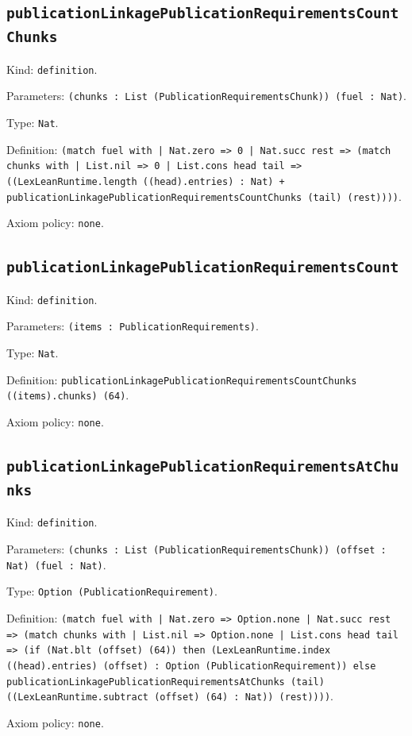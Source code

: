 \documentclass[11pt]{article}
\begin{document}
\subsection*{\texttt{publicationLinkagePublicationRequirementsCountChunks}}
\noindent Kind: \texttt{definition}.\par
\noindent Parameters: \texttt{(chunks : List (PublicationRequirementsChunk)) (fuel : Nat)}.\par
\noindent Type: \texttt{Nat}.\par
\noindent Definition: \texttt{(match fuel with | Nat.zero => 0 | Nat.succ rest => (match chunks with | List.nil => 0 | List.cons head tail => ((LexLeanRuntime.length ((head).entries) : Nat) + publicationLinkagePublicationRequirementsCountChunks (tail) (rest))))}.\par
\noindent Axiom policy: \texttt{none}.\par
\subsection*{\texttt{publicationLinkagePublicationRequirementsCount}}
\noindent Kind: \texttt{definition}.\par
\noindent Parameters: \texttt{(items : PublicationRequirements)}.\par
\noindent Type: \texttt{Nat}.\par
\noindent Definition: \texttt{publicationLinkagePublicationRequirementsCountChunks ((items).chunks) (64)}.\par
\noindent Axiom policy: \texttt{none}.\par
\subsection*{\texttt{publicationLinkagePublicationRequirementsAtChunks}}
\noindent Kind: \texttt{definition}.\par
\noindent Parameters: \texttt{(chunks : List (PublicationRequirementsChunk)) (offset : Nat) (fuel : Nat)}.\par
\noindent Type: \texttt{Option (PublicationRequirement)}.\par
\noindent Definition: \texttt{(match fuel with | Nat.zero => Option.none | Nat.succ rest => (match chunks with | List.nil => Option.none | List.cons head tail => (if (Nat.blt (offset) (64)) then (LexLeanRuntime.index ((head).entries) (offset) : Option (PublicationRequirement)) else publicationLinkagePublicationRequirementsAtChunks (tail) ((LexLeanRuntime.subtract (offset) (64) : Nat)) (rest))))}.\par
\noindent Axiom policy: \texttt{none}.\par
\end{document}
